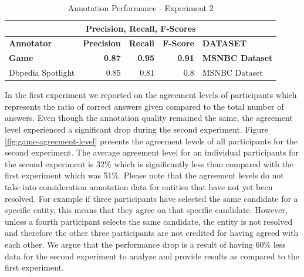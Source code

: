 \begin{table}[htbp]
  \centering
  \caption{Annotation Performance - Experiment 2}
    \begin{tabular}{|l|r|r|r|l|}
    \toprule
    \multicolumn{5}{|c|}{\textbf{Precision, Recall, F-Scores}} \\
    \midrule
    \textbf{Annotator} & \multicolumn{1}{l|}{\textbf{Precision}} & \multicolumn{1}{l|}{\textbf{Recall}} & \multicolumn{1}{l|}{\textbf{F-Score}} & \textbf{DATASET} \\
    \midrule
    \rowcolor \textcolor[rgb]{ .8,  0,  0}{\textbf{Game}} & \textcolor[rgb]{ .8,  0,  0}{\textbf{0.87}} & \textcolor[rgb]{ .8,  0,  0}{\textbf{0.95}} & \textcolor[rgb]{ .8,  0,  0}{\textbf{0.91}} & \textcolor[rgb]{ .8,  0,  0}{\textbf{MSNBC Dataset}} \\
    \midrule
    Dbpedia Spotlight & 0.85  & 0.81  & 0.8   & MSNBC Dataset \\
    \bottomrule
    \end{tabular}%
  \label{tab:ex2-annotation-performance}%
\end{table}%


In the first experiment we reported on the agreement levels of participants which represents the ratio of correct answers given compared to the total number of answers. Even though the annotation quality remained the same, the agreement level experienced a significant drop during the second experiment. Figure \ref{fig:game-agreement-level} presents the agreement levels of all participants for the second experiment. The average agreement level for an individual participants for the second experiment is 32\% which is significantly less than compared with the first experiment which was 51\%. Please note that the agreement levels do not take into consideration annotation data for entities that have not yet been resolved. For example if three participants have selected the same candidate for a specific entity, this means that they agree on that specific candidate. However, unless a fourth participant selects the same candidate, the entity is not resolved and therefore the other three participants are not credited for having agreed with each other. We argue that the performance drop is a result of having 60\% less data for the second experiment to analyze and provide results as compared to the first experiment. 

